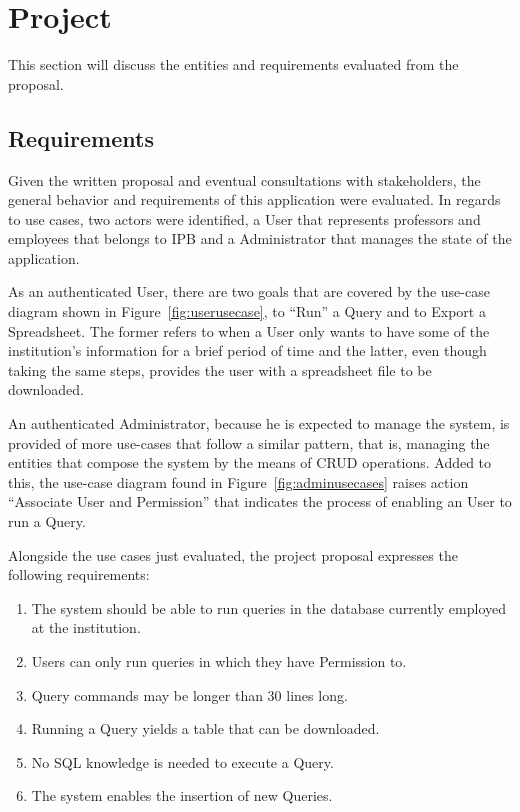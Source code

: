 \chapter{Project}

This section will discuss the entities and requirements evaluated from the proposal.

\section{Requirements}
Given the written proposal and eventual consultations with stakeholders, the general behavior and requirements of this application were evaluated. In regards to use cases, two actors were identified, a User that represents professors and employees that belongs to \gls{IPB} and a Administrator that manages the state of the application.

As an authenticated User, there are two goals that are covered by the use-case diagram shown in Figure~\ref{fig:userusecase}, to ``Run'' a Query and to Export a Spreadsheet. The former refers to when a User only wants to have some of the institution's information for a brief period of time and the latter, even though taking the same steps, provides the user with a spreadsheet file to be downloaded.

An authenticated Administrator, because he is expected to manage the system, is provided of more use-cases that follow a similar pattern, that is, managing the entities that compose the system by the means of \gls{CRUD} operations. Added to this, the use-case diagram found in Figure~\ref{fig:adminusecases} raises action ``Associate User and Permission'' that indicates the process of enabling an User to run a Query.

Alongside the use cases just evaluated, the project proposal expresses the following requirements:
\begin{enumerate}
\item The system should be able to run queries in the database currently employed at the institution.\label{req:multidb}
\item Users can only run queries in which they have Permission to.\label{req:permission}
\item Query commands may be longer than 30 lines long.\label{req:longquery}
\item Running a Query yields a table that can be downloaded.\label{req:download}
\item No \gls{SQL} knowledge is needed to execute a Query.\label{req:noknowledge}
\item The system enables the insertion of new Queries.\label{req:addquery}
\end{enumerate}

